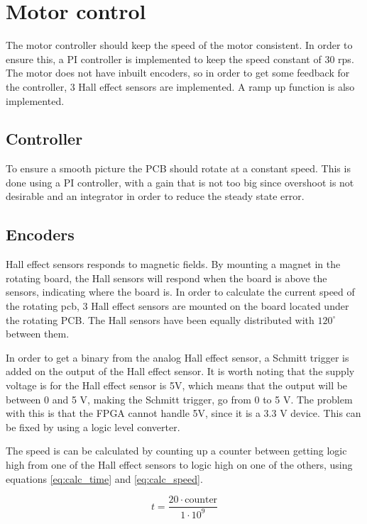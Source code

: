 \section{Motor control}
The motor controller should keep the speed of the motor consistent.
In order to ensure this, a PI controller is implemented to keep the speed constant of 30 rps.
The motor does not have inbuilt encoders, so in order to get some feedback for the controller, 3 Hall effect sensors are implemented.
A ramp up function is also implemented.

\subsection{Controller}

To ensure a smooth picture the PCB should rotate at a constant speed.
This is done using a PI controller, with a gain that is not too big since overshoot is not desirable and an integrator in order to reduce the steady state error.

\subsection{Encoders} \label{sec:encoders}

Hall effect sensors responds to magnetic fields.
By mounting a magnet in the rotating board, the Hall sensors will respond when the board is above the sensors, indicating where the board is.
In order to calculate the current speed of the rotating pcb, 3 Hall effect sensors are mounted on the board located under the rotating PCB.
The Hall sensors have been equally distributed with $120^{\circ}$ between them.

In order to get a binary from the analog Hall effect sensor, a Schmitt trigger\cite[p. 655]{book:prac_ele} is added on the output of the Hall effect sensor.
It is worth noting that the supply voltage is for the Hall effect sensor is 5V, which means that the output will be between 0 and 5 V, making the Schmitt trigger, go from 0 to 5 V.
The problem with this is that the FPGA cannot handle 5V, since it is a 3.3 V device.
This can be fixed by using a logic level converter. 

The speed is can be calculated by counting up a counter between getting logic high from one of the Hall effect sensors to  logic high on one of the others, using equations  \ref{eq:calc_time} and \ref{eq:calc_speed}.

\begin{equation} \label{eq:calc_time}
 t = \frac{20\cdot \text{counter}}{1\cdot 10^9}
\end{equation}

